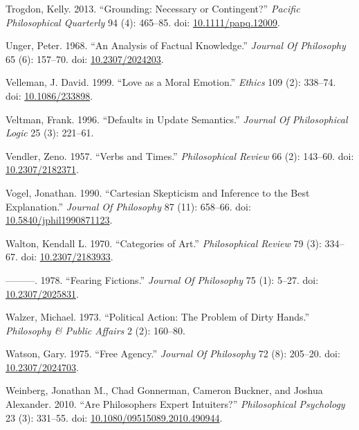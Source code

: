\documentclass[
  10pt,
  letterpaper,
  DIV=11,
  numbers=noendperiod,
  twoside]{scrartcl}
\newlength{\cslhangindent}
\newenvironment{CSLReferences}[2] %
 {\begin{list}{}{%
  \setlength{\itemindent}{0pt}
  \setlength{\leftmargin}{0pt}
  \setlength{\parsep}{0pt}
  \ifodd #1
   \setlength{\leftmargin}{\cslhangindent}
   \setlength{\itemindent}{-1\cslhangindent}
  \fi
  \setlength{\itemsep}{#2\baselineskip}}}
 {\end{list}}
\begin{document}
\begin{CSLReferences}{1}{0}
Trogdon, Kelly. 2013. {``Grounding: Necessary or Contingent?''}
\emph{Pacific Philosophical Quarterly} 94 (4): 465--85. doi:
\href{https://doi.org/10.1111/papq.12009}{10.1111/papq.12009}.

Unger, Peter. 1968. {``An Analysis of Factual Knowledge.''}
\emph{Journal Of Philosophy} 65 (6): 157--70. doi:
\href{https://doi.org/10.2307/2024203}{10.2307/2024203}.

Velleman, J. David. 1999. {``Love as a Moral Emotion.''} \emph{Ethics}
109 (2): 338--74. doi:
\href{https://doi.org/10.1086/233898}{10.1086/233898}.

Veltman, Frank. 1996. {``Defaults in Update Semantics.''} \emph{Journal
Of Philosophical Logic} 25 (3): 221--61.

Vendler, Zeno. 1957. {``Verbs and Times.''} \emph{Philosophical Review}
66 (2): 143--60. doi:
\href{https://doi.org/10.2307/2182371}{10.2307/2182371}.

Vogel, Jonathan. 1990. {``Cartesian Skepticism and Inference to the Best
Explanation.''} \emph{Journal Of Philosophy} 87 (11): 658--66. doi:
\href{https://doi.org/10.5840/jphil1990871123}{10.5840/jphil1990871123}.

Walton, Kendall L. 1970. {``Categories of Art.''} \emph{Philosophical
Review} 79 (3): 334--67. doi:
\href{https://doi.org/10.2307/2183933}{10.2307/2183933}.

---------. 1978. {``Fearing Fictions.''} \emph{Journal Of Philosophy} 75
(1): 5--27. doi:
\href{https://doi.org/10.2307/2025831}{10.2307/2025831}.

Walzer, Michael. 1973. {``Political Action: The Problem of Dirty
Hands.''} \emph{Philosophy \& Public Affairs} 2 (2): 160--80.

Watson, Gary. 1975. {``Free Agency.''} \emph{Journal Of Philosophy} 72
(8): 205--20. doi:
\href{https://doi.org/10.2307/2024703}{10.2307/2024703}.

Weinberg, Jonathan M., Chad Gonnerman, Cameron Buckner, and Joshua
Alexander. 2010. {``Are Philosophers Expert Intuiters?''}
\emph{Philosophical Psychology} 23 (3): 331--55. doi:
\href{https://doi.org/10.1080/09515089.2010.490944}{10.1080/09515089.2010.490944}.


\end{CSLReferences}
\end{document}
